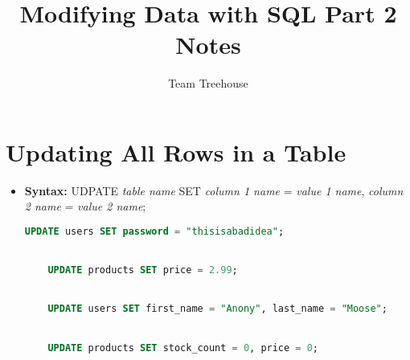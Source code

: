 \documentclass[12pt]{article}
\begin{document}
\title{Modifying Data with SQL Part 2 Notes}
\author{Team Treehouse}
\maketitle

\bigskip

\section{Updating All Rows in a Table}

\bigskip

\begin{itemize}
    \item \textbf{Syntax:} UDPATE \textit{table name} SET \textit{column 1 name} = \textit{value 1 name}, \textit{column 2 name} = \textit{value 2 name};

    \begin{lstlisting}[language=SQL]
    UPDATE users SET password = "thisisabadidea";


    UPDATE products SET price = 2.99;


    UPDATE users SET first_name = "Anony", last_name = "Moose";


    UPDATE products SET stock_count = 0, price = 0;
    \end{lstlisting}
\end{itemize}
\end{document}

